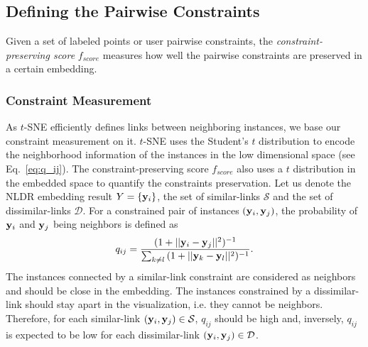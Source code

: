 
\subsection{Defining the Pairwise Constraints}\label{subsec:s_score}

Given a set of labeled points or user pairwise constraints, the \emph{constraint-preserving score} $f_{score}$ measures how well the pairwise constraints are preserved in a certain embedding.

\subsubsection*{Constraint Measurement}
As $t$-SNE efficiently defines links between neighboring instances, we base our constraint measurement on it. $t$-SNE uses the Student's $t$ distribution to encode the neighborhood information of the instances in the low dimensional space (see Eq.~\ref{eq:q_ij}).
The constraint-preserving score $f_{score}$ also uses a $t$ distribution in the embedded space to quantify the constraints preservation.
Let us denote the NLDR embedding result ${Y} = \{{{\bf y}_i}\}$, the set of similar-links $\mathcal{S}$ and the set of dissimilar-links $\mathcal{D}$. 
For a constrained pair of instances $({\bf y}_i, {\bf y}_j)$, the probability of ${\bf y}_i$ and ${\bf y}_j$ being neighbors is defined as
\begin{equation}\label{equ:q_link}
    q_{ij} = \frac
    { ( 1 + || {\bf y}_i - {\bf y}_j ||^2 )^{-1} }
    { \sum_{k \neq l} { ( 1 + ||{\bf y}_k - {\bf y}_l||^2 )^{-1} } }.
\end{equation}
The instances connected by a similar-link constraint are considered as neighbors and should be close in the embedding.
The instances constrained by a dissimilar-link should stay apart in the visualization, i.e. they cannot be neighbors.
Therefore, for each similar-link $({\bf y}_i, {\bf y}_j) \in \mathcal{S}$, $q_{ij}$ should be high and, inversely, $q_{ij}$ is expected to be low for each dissimilar-link $({\bf y}_i, {\bf y}_j) \in \mathcal{D}$.

